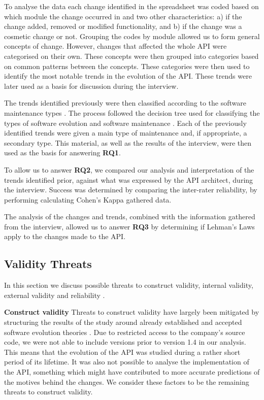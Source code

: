 \documentclass{sig-alternate}
\begin{document}
To analyse the data each change identified in the spreadsheet was coded based on which module the change occurred in and two other characteristics: a) if the change added, removed or modified functionality, and b) if the change was a cosmetic change or not.
Grouping the codes by module allowed us to form general concepts of change. However, changes that affected the whole API were categorised on their own.
These concepts were then grouped into categories based on common patterns between the concepts.
These categories were then used to identify the most notable trends in the evolution of the API. These trends were later used as a basis for discussion during the interview.

The trends identified previously were then classified according to the software maintenance types \cite{chapin2001types}. The process followed the decision tree used for classifying the types of software evolution and software maintenance \cite{chapin2001types}. Each of the previously identified trends were given a main type of maintenance and, if appropriate, a secondary type. This material, as well as the results of the interview, were then used as the basis for answering \textbf{RQ1}.

To allow us to answer \textbf{RQ2}, we compared our analysis and interpretation of the trends identified prior, against what was expressed by the API architect, during the interview. Success was determined by comparing the inter-rater reliability, by performing calculating Cohen's Kappa gathered data. 

The analysis of the changes and trends, combined with the information gathered from the interview, allowed us to answer \textbf{RQ3} by determining if Lehman's Laws apply to the changes made to the API. 




\subsection{Validity Threats} \label{validity_threats} %
In this section we discuss possible threats to construct validity, internal validity, external validity and reliability \cite{runeson2009guidelines}.

\smallskip \noindent
\textbf{Construct validity  } Threats to construct validity have largely been mitigated by structuring the results of the study around already established and accepted software evolution theories \cite{chapin2001types} \cite{lehman1980programs}. Due to restricted access to the company's source code, we were not able to include versions prior to version 1.4 in our analysis. This means that the evolution of the API was studied during a rather short period of its lifetime. It was also not possible to analyse the implementation of the API, something which might have contributed to more accurate predictions of the motives behind the changes. We consider these factors to be the remaining threats to construct validity. 
\end{document}
